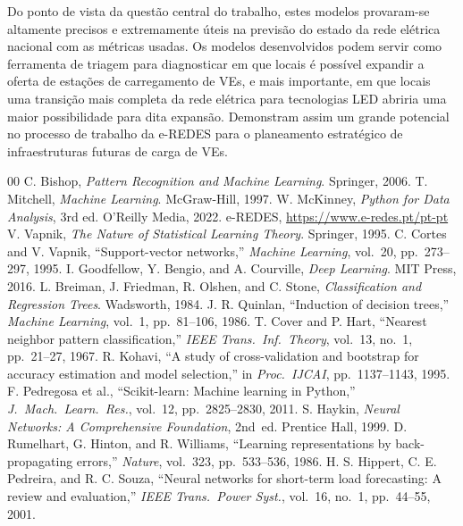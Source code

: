 \documentclass[conference]{IEEEtran}
\begin{document}
Do ponto de vista da questão central do trabalho, estes modelos provaram-se altamente precisos e extremamente úteis na previsão do estado da rede elétrica nacional com as métricas usadas. Os modelos desenvolvidos podem servir como ferramenta de triagem para diagnosticar em que locais é possível expandir a oferta de estações de carregamento de VEs, e mais importante, em que locais uma transição mais completa da rede elétrica para tecnologias LED abriria uma maior possibilidade para dita expansão. Demonstram assim um grande potencial no processo de trabalho da e-REDES para o planeamento estratégico de infraestruturas futuras de carga de VEs.
\begin{thebibliography}{00}
 C. Bishop, \textit{Pattern Recognition and Machine Learning}. Springer, 2006.
 T. Mitchell, \textit{Machine Learning}. McGraw-Hill, 1997.
 W. McKinney, \textit{Python for Data Analysis}, 3rd ed. O'Reilly Media, 2022.
 e-REDES, \url{https://www.e-redes.pt/pt-pt}
 V. Vapnik, \textit{The Nature of Statistical Learning Theory}. Springer, 1995.
 C. Cortes and V. Vapnik, ``Support-vector networks,'' \textit{Machine Learning}, vol.~20, pp.~273--297, 1995.
 I. Goodfellow, Y. Bengio, and A. Courville, \textit{Deep Learning}. MIT Press, 2016.
 L. Breiman, J. Friedman, R. Olshen, and C. Stone, \textit{Classification and Regression Trees}. Wadsworth, 1984.
 J. R. Quinlan, ``Induction of decision trees,'' \textit{Machine Learning}, vol.~1, pp.~81--106, 1986.
 T. Cover and P. Hart, ``Nearest neighbor pattern classification,'' \textit{IEEE Trans.\ Inf.\ Theory}, vol.~13, no.~1, pp.~21--27, 1967.
 R. Kohavi, ``A study of cross-validation and bootstrap for accuracy estimation and model selection,'' in \textit{Proc.\ IJCAI}, pp.~1137--1143, 1995.
 F. Pedregosa et al., ``Scikit-learn: Machine learning in Python,'' \textit{J.\ Mach.\ Learn.\ Res.}, vol.~12, pp.~2825--2830, 2011.
 S. Haykin, \textit{Neural Networks: A Comprehensive Foundation}, 2nd~ed. Prentice Hall, 1999.
 D. Rumelhart, G. Hinton, and R. Williams, ``Learning representations by back-propagating errors,'' \textit{Nature}, vol.~323, pp.~533--536, 1986.
 H. S. Hippert, C. E. Pedreira, and R. C. Souza, ``Neural networks for short-term load forecasting: A review and evaluation,'' \textit{IEEE Trans.\ Power Syst.}, vol.~16, no.~1, pp.~44--55, 2001.
\end{thebibliography}
\end{document}
